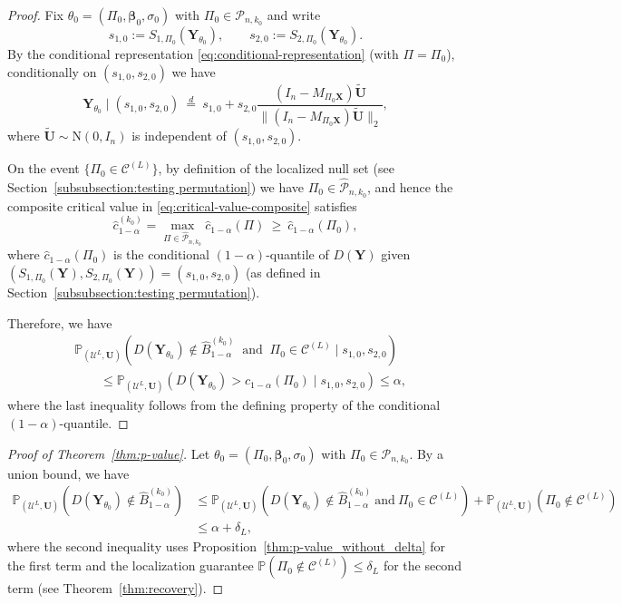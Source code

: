 \documentclass[11pt, reqno]{amsart}
\newcommand{\bP}{\mathbb{P}}
\renewcommand{\hat}{\widehat}
\renewcommand{\le}{\leqslant}
\renewcommand{\ge}{\geqslant}
\newcommand{\mC}{\mathcal{C}}
\newcommand{\mP}{\mathcal{P}}
\newcommand{\1}{\mbox{1}\hspace{-0.25em}\mbox{l}}
\newcommand{\Normal}{\mathrm{N}}
\theoremstyle{definition}\newtheorem{problem}{Problem}[section]
\theoremstyle{definition}\newtheorem{definition}[problem]{Definition}
\theoremstyle{remark}\newtheorem{assumption}{Assumption}
\theoremstyle{remark}\newtheorem{remark}[problem]{Remark}
\theoremstyle{definition}\newtheorem{example}[problem]{Example}
\theoremstyle{plain}\newtheorem{theorem}[problem]{Theorem}
\theoremstyle{plain}\newtheorem{question}[problem]{Question}
\theoremstyle{plain}\newtheorem{lemma}[problem]{Lemma}
\theoremstyle{plain}\newtheorem{proposition}[problem]{Proposition}
\theoremstyle{plain}\newtheorem{corollary}[problem]{Corollary}
\theoremstyle{plain}\newtheorem{conjecture}[problem]{Conjecture}
\begin{document}
\begin{proof}
Fix $\theta_0=(\Pi_0,\bm\beta_0,\sigma_0)$ with $\Pi_0\in\mP_{n,k_0}$ and write
\[
s_{1,0}:=S_{1,\Pi_0}(\bm Y_{\theta_0}),
\qquad
s_{2,0}:=S_{2,\Pi_0}(\bm Y_{\theta_0}).
\]
By the conditional representation \eqref{eq:conditional-representation} (with $\Pi=\Pi_0$), conditionally on $(s_{1,0},s_{2,0})$ we have
\[
\bm Y_{\theta_0}\mid (s_{1,0},s_{2,0})
\ \overset{d}{=}\
s_{1,0}
+
s_{2,0}\frac{(I_n-M_{\Pi_0\bm X})\widetilde{\bm U}}{\|(I_n-M_{\Pi_0\bm X})\widetilde{\bm U}\|_2},
\]
where $\widetilde{\bm U}\sim\Normal(0,I_n)$ is independent of $(s_{1,0},s_{2,0})$.

On the event $\{\Pi_0\in \mC^{(L)}\}$, by definition of the localized null set (see Section~\ref{subsubsection:testing permutation}) we have
$\Pi_0\in\hat{\mP}_{n,k_0}$, and hence the composite critical value in \eqref{eq:critical-value-composite} satisfies
\[
\widehat c_{1-\alpha}^{(k_0)}
=\max_{\Pi\in \hat{\mP}_{n,k_0}}\widehat c_{1-\alpha}(\Pi)
\ \ge\
\widehat c_{1-\alpha}(\Pi_0),
\]
where $\widehat c_{1-\alpha}(\Pi_0)$ is the conditional $(1-\alpha)$-quantile of $D(\bm Y)$ given
$\left(S_{1,\Pi_0}(\bm Y),S_{2,\Pi_0}(\bm Y)\right)=(s_{1,0},s_{2,0})$
(as defined in Section~\ref{subsubsection:testing permutation}).

Therefore, we have
\begin{align*}
&\bP_{\left(\mathcal{U}^L, \bm{U}\right)}\left(
D(\bm Y_{\theta_0})\notin \hat B^{(k_0)}_{1-\alpha}\ \text{ and }\ \Pi_0\in \mC^{(L)}
\mid s_{1,0},s_{2,0}
\right)\\
&\qquad\le
\bP_{\left(\mathcal{U}^L, \bm{U}\right)}\left(
D(\bm Y_{\theta_0})>
\widehat c_{1-\alpha}(\Pi_0)
\mid s_{1,0},s_{2,0}
\right)
 \le \alpha,
\end{align*}
where the last inequality follows from the defining property of the conditional $(1-\alpha)$-quantile.
\end{proof}

\begin{proof}[Proof of Theorem~\ref{thm:p-value}]
Let $\theta_0=(\Pi_0,\bm\beta_0,\sigma_0)$ with $\Pi_0\in\mP_{n,k_0}$.
By a union bound, we have
\begin{align*}
\bP_{\left(\mathcal{U}^L,\bm U\right)}\left(D(\bm Y_{\theta_0})\notin \hat{B}^{(k_0)}_{1-\alpha}\right)
&\le
\bP_{\left(\mathcal{U}^L,\bm U\right)}\left(D(\bm Y_{\theta_0})\notin \hat{B}^{(k_0)}_{1-\alpha}\ \text{and}\ \Pi_0\in\mC^{(L)}\right)
+
\bP_{\left(\mathcal{U}^L,\bm U\right)}\left(\Pi_0\notin\mC^{(L)}\right)\\
&\le \alpha+\delta_L,
\end{align*}
where the second inequality uses Proposition~\ref{thm:p-value_without_delta} for the first term and the localization guarantee
$\bP(\Pi_0\notin\mC^{(L)})\le \delta_L$ for the second term (see Theorem~\ref{thm:recovery}).
\end{proof}
\end{document}
